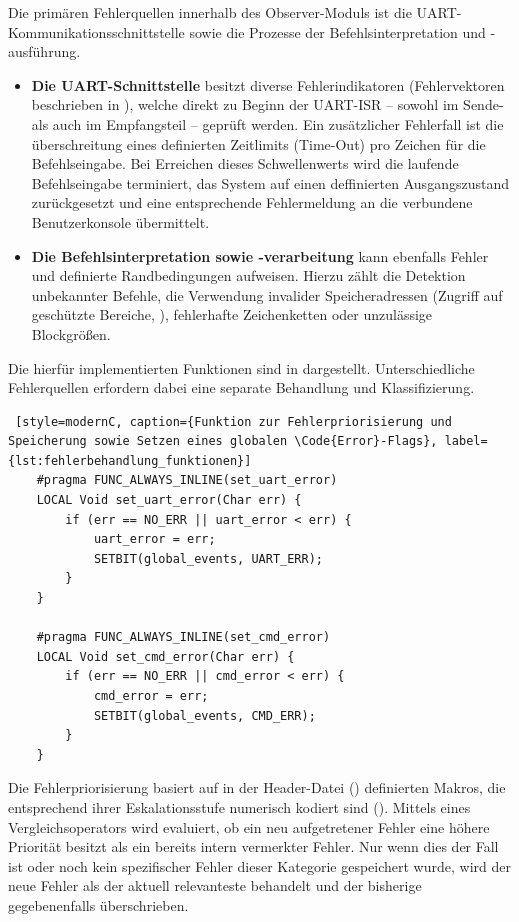 Die prim\"aren Fehlerquellen innerhalb des Observer-Moduls ist die UART- Kommunikationsschnittstelle sowie die Prozesse der Befehlsinterpretation und -ausf\"uhrung.
\begin{itemize}
	\item \textbf{Die UART-Schnittstelle} besitzt diverse Fehlerindikatoren (Fehlervektoren beschrieben in ), welche direkt zu Beginn der UART-ISR -- sowohl im Sende- als auch im Empfangsteil -- gepr\"uft werden. Ein zus\"atzlicher Fehlerfall ist die \"uberschreitung eines definierten Zeitlimits (Time-Out) pro Zeichen f\"ur die Befehlseingabe. Bei Erreichen dieses Schwellenwerts wird die laufende Befehlseingabe terminiert, das System auf einen deffinierten Ausgangszustand zur\"uckgesetzt und eine entsprechende Fehlermeldung an die verbundene Benutzerkonsole \"ubermittelt.
	
	\item \textbf{Die Befehlsinterpretation sowie -verarbeitung} kann ebenfalls Fehler und definierte Randbedingungen aufweisen. Hierzu z\"ahlt die Detektion unbekannter Befehle, die Verwendung invalider Speicheradressen (\zB Zugriff auf gesch\"utzte Bereiche, \Vgl {}), fehlerhafte Zeichenketten oder unzul\"assige Blockgr\"o{\ss}en.
\end{itemize}

\newpage
Die hierf\"ur implementierten Funktionen sind in  dargestellt. Unterschiedliche Fehlerquellen erfordern dabei eine separate Behandlung und Klassifizierung. 

\vspace{0.5cm}
\begin{lstlisting} [style=modernC, caption={Funktion zur Fehlerpriorisierung und Speicherung sowie Setzen eines globalen \Code{Error}-Flags}, label={lst:fehlerbehandlung_funktionen}]
	#pragma FUNC_ALWAYS_INLINE(set_uart_error)
	LOCAL Void set_uart_error(Char err) {
		if (err == NO_ERR || uart_error < err) {
			uart_error = err;
			SETBIT(global_events, UART_ERR);
		}
	}
	
	#pragma FUNC_ALWAYS_INLINE(set_cmd_error)
	LOCAL Void set_cmd_error(Char err) {
		if (err == NO_ERR || cmd_error < err) {
			cmd_error = err;
			SETBIT(global_events, CMD_ERR);
		}
	}
\end{lstlisting}

Die Fehlerpriorisierung basiert auf in der Header-Datei () definierten Makros, die entsprechend ihrer Eskalationsstufe numerisch kodiert sind (). Mittels eines Vergleichsoperators wird evaluiert, ob ein neu aufgetretener Fehler eine h\"ohere Priorit\"at besitzt als ein bereits intern vermerkter Fehler. Nur wenn dies der Fall ist oder noch kein spezifischer Fehler dieser Kategorie gespeichert wurde, wird der neue Fehler als der aktuell relevanteste behandelt und der bisherige gegebenenfalls \"uberschrieben.


